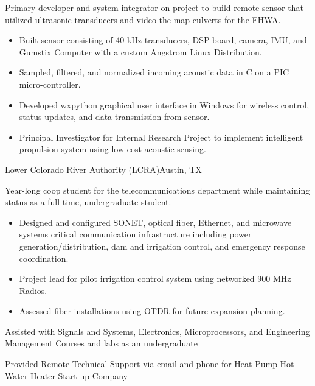 \documentclass[11pt,a4paper,sans]{moderncv}
\begin{document}
{
    Primary developer and system integrator on project to build remote sensor that utilized ultrasonic
transducers and video the map culverts for the FHWA. 
     \begin{itemize}
        \item Built sensor consisting of 40 kHz transducers, DSP board, 
            camera, IMU, and Gumstix Computer with a custom Angstrom Linux Distribution. 
        \item Sampled, filtered, and normalized incoming acoustic data in C on a 
            PIC micro-controller.
        \item Developed wxpython graphical user interface in Windows for wireless control, 
            status updates, and data transmission from sensor. 
        \item Principal Investigator for Internal Research Project to 
            implement intelligent propulsion
            system using low-cost acoustic sensing. 
    \end{itemize}
    }

            {Lower Colorado River Authority (LCRA)}{Austin, TX}{}
            {Year-long coop student for the telecommunications department 
            while maintaining status as a full-time, undergraduate student.
 \begin{itemize}
        \item Designed and configured SONET, optical fiber, Ethernet, and microwave systems
            critical communication infrastructure including power generation/distribution, dam and 
            irrigation control, and emergency response coordination. 
        \item Project lead for pilot irrigation control system using networked
            900 MHz Radios. 
        \item Assessed fiber installations using OTDR for future expansion planning.
    \end{itemize}
}

{Assisted with Signals and Systems, Electronics, Microprocessors, and 
Engineering Management Courses and labs as an undergraduate}

{Provided Remote Technical Support via email and phone for Heat-Pump Hot Water Heater Start-up Company}
\end{document}
